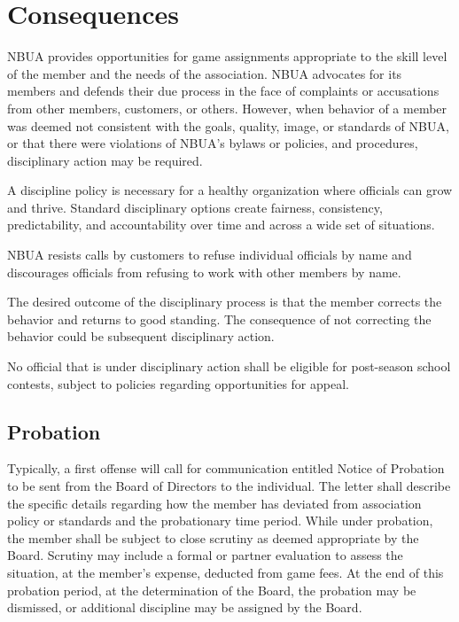 \documentclass[letterpaper,11pt,colorlinks=true,allcolors=blue]{article}
\begin{document}
\section{Consequences}

NBUA provides opportunities for game assignments appropriate to the skill level of the member and the needs of the association. NBUA advocates for its members and defends their due process in the face of complaints or accusations from other members, customers, or others. However, when behavior of a member was deemed not consistent with the goals, quality, image, or standards of NBUA, or that there were violations of NBUA’s bylaws or policies, and procedures, disciplinary action may be required.

A discipline policy is necessary for a healthy organization where officials can grow and thrive. Standard disciplinary options create fairness, consistency, predictability, and accountability over time and across a wide set of situations.

NBUA resists calls by customers to refuse individual officials by name and discourages officials from refusing to work with other members by name.

The desired outcome of the disciplinary process is that the member corrects the behavior and returns to good standing.  The consequence of not correcting the behavior could be subsequent disciplinary action. 

No official that is under disciplinary action shall be eligible for post-season school contests, subject to policies regarding opportunities for appeal.

\subsection{Probation}

Typically, a first offense will call for communication entitled Notice of Probation to be sent from the Board of Directors to the individual.  The letter shall describe the specific details regarding how the member has deviated from association policy or standards and the probationary time period.  While under probation, the member shall be subject to close scrutiny as deemed appropriate by the Board.  Scrutiny may include a formal or partner evaluation to assess the situation, at the member’s expense, deducted from game fees.  At the end of this probation period, at the determination of the Board, the probation may be dismissed, or additional discipline may be assigned by the Board.
\end{document}
